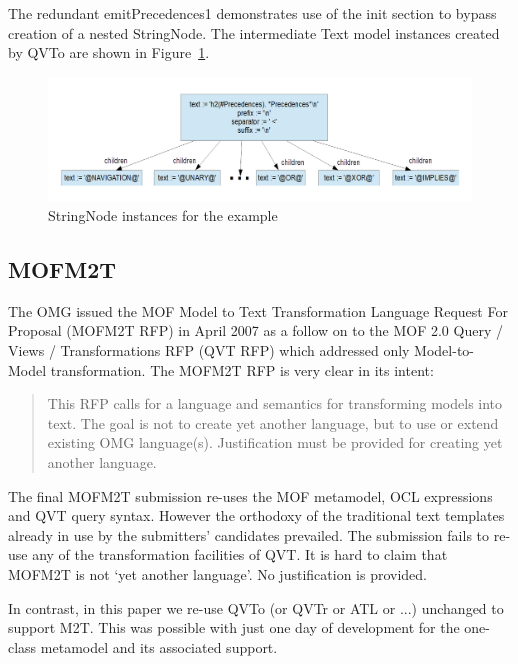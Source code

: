 \documentclass{llncs}
\begin{document}
The redundant emitPrecedences1 demonstrates use of the init section to bypass creation of a nested StringNode. The intermediate Text model instances created by QVTo are shown in Figure~\ref{fig:ExampleInstances}.

\begin{figure}
	\begin{center}
		\includegraphics[width=4.9in]{ExampleInstances.png}
	\end{center}
	\caption{StringNode instances for the example}
	\label{fig:ExampleInstances}
\end{figure}

\subsection{MOFM2T}\label{MOFM2T}

The OMG issued the MOF Model to Text Transformation Language Request For Proposal (MOFM2T RFP) in April 2007 as a follow on to the MOF 2.0 Query / Views / Transformations RFP (QVT RFP) which addressed only Model-to-Model transformation. The MOFM2T RFP \cite{MOFM2T-RFP} is very clear in its intent:

\begin{quote}
This RFP calls for a language and semantics for transforming models into text.
The goal is not to create yet another language, but to use or extend existing
OMG language(s). Justification must be provided for creating yet another
language.
\end{quote}

The final MOFM2T submission \cite{MOFM2T-SUB} re-uses the MOF metamodel, OCL expressions
and QVT query syntax. However the orthodoxy of the traditional text templates already in use by the submitters' candidates prevailed. The submission fails to re-use any of the transformation facilities of QVT. It is hard to claim that MOFM2T is not `yet another language'. No justification is provided.

In contrast, in this paper we re-use QVTo (or QVTr or ATL or ...) unchanged to support M2T. This was possible with just one day of development for the one-class metamodel and its associated support.
\end{document}
